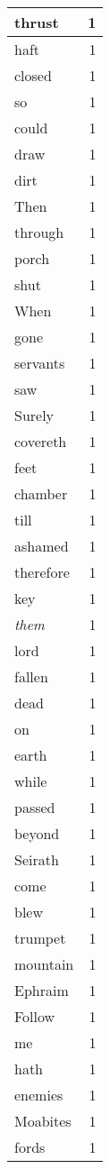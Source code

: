 \begin{center}
\begin{longtable}{l|r}
thrust & 1 \\ \hline
haft & 1 \\ \hline
closed & 1 \\ \hline
so & 1 \\ \hline
could & 1 \\ \hline
draw & 1 \\ \hline
dirt & 1 \\ \hline
Then & 1 \\ \hline
through & 1 \\ \hline
porch & 1 \\ \hline
shut & 1 \\ \hline
When & 1 \\ \hline
gone & 1 \\ \hline
servants & 1 \\ \hline
saw & 1 \\ \hline
Surely & 1 \\ \hline
covereth & 1 \\ \hline
feet & 1 \\ \hline
chamber & 1 \\ \hline
till & 1 \\ \hline
ashamed & 1 \\ \hline
therefore & 1 \\ \hline
key & 1 \\ \hline
\emph{them} & 1 \\ \hline
lord & 1 \\ \hline
fallen & 1 \\ \hline
dead & 1 \\ \hline
on & 1 \\ \hline
earth & 1 \\ \hline
while & 1 \\ \hline
passed & 1 \\ \hline
beyond & 1 \\ \hline
Seirath & 1 \\ \hline
come & 1 \\ \hline
blew & 1 \\ \hline
trumpet & 1 \\ \hline
mountain & 1 \\ \hline
Ephraim & 1 \\ \hline
Follow & 1 \\ \hline
me & 1 \\ \hline
hath & 1 \\ \hline
enemies & 1 \\ \hline
Moabites & 1 \\ \hline
fords & 1 \\ \hline

\end{longtable}
\end{center}
